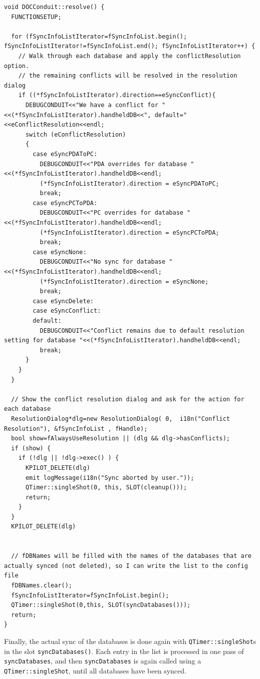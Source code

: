 \documentclass[10pt,a4paper]{article}
\newcommand{\code}[1]{{\small\texttt{#1}}}
\begin{document}
{\footnotesize
\begin{verbatim}
void DOCConduit::resolve() {
  FUNCTIONSETUP;
  
  for (fSyncInfoListIterator=fSyncInfoList.begin(); fSyncInfoListIterator!=fSyncInfoList.end(); fSyncInfoListIterator++) {
    // Walk through each database and apply the conflictResolution option. 
    // the remaining conflicts will be resolved in the resolution dialog
    if ((*fSyncInfoListIterator).direction==eSyncConflict){
      DEBUGCONDUIT<<"We have a conflict for "<<(*fSyncInfoListIterator).handheldDB<<", default="<<eConflictResolution<<endl;
      switch (eConflictResolution)
      {
        case eSyncPDAToPC:
          DEBUGCONDUIT<<"PDA overrides for database "<<(*fSyncInfoListIterator).handheldDB<<endl;
          (*fSyncInfoListIterator).direction = eSyncPDAToPC;
          break;
        case eSyncPCToPDA:
          DEBUGCONDUIT<<"PC overrides for database "<<(*fSyncInfoListIterator).handheldDB<<endl;
          (*fSyncInfoListIterator).direction = eSyncPCToPDA;
          break;
        case eSyncNone:
          DEBUGCONDUIT<<"No sync for database "<<(*fSyncInfoListIterator).handheldDB<<endl;
          (*fSyncInfoListIterator).direction = eSyncNone;
          break;
        case eSyncDelete:
        case eSyncConflict:
        default:
          DEBUGCONDUIT<<"Conflict remains due to default resolution setting for database "<<(*fSyncInfoListIterator).handheldDB<<endl;
          break;
      }
    }
  }
  
  // Show the conflict resolution dialog and ask for the action for each database
  ResolutionDialog*dlg=new ResolutionDialog( 0,  i18n("Conflict Resolution"), &fSyncInfoList , fHandle);
  bool show=fAlwaysUseResolution || (dlg && dlg->hasConflicts);
  if (show) {
    if (!dlg || !dlg->exec() ) {
      KPILOT_DELETE(dlg)
      emit logMessage(i18n("Sync aborted by user."));
      QTimer::singleShot(0, this, SLOT(cleanup()));
      return;
    }
  }
  KPILOT_DELETE(dlg)
  

  // fDBNames will be filled with the names of the databases that are actually synced (not deleted), so I can write the list to the config file
  fDBNames.clear();
  fSyncInfoListIterator=fSyncInfoList.begin();
  QTimer::singleShot(0,this, SLOT(syncDatabases()));
  return;
}
\end{verbatim}
}


Finally, the actual sync of the databases is done again with \code{QTimer::singleShot}s in the slot \code{syncDatabases()}. Each entry in the list is processed in one pass of \code{syncDatabases}, and then \code{syncDatabases} is again called using a \code{QTimer::singleShot}, until all databases have been synced.
\end{document}
